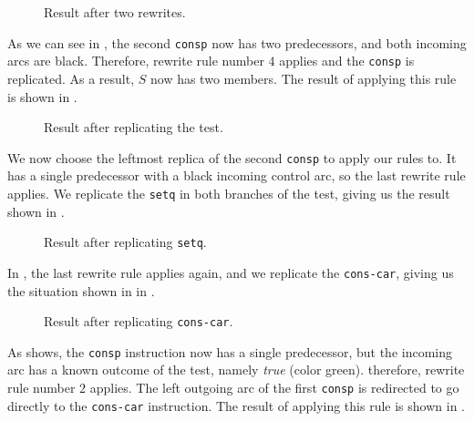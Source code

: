 \begin{figure}
\begin{center}
\end{center}
\caption{\label{fig-rewrite-2}
Result after two rewrites.}
\end{figure}

As we can see in , the second \texttt{consp}
now has two predecessors, and both incoming arcs are black.
Therefore, rewrite rule number $4$ applies and the \texttt{consp} is
replicated.  As a result, $S$ now has two members.  The result of
applying this rule is shown in .

\begin{figure}
\begin{center}
\end{center}
\caption{\label{fig-rewrite-3}
Result after replicating the test.}
\end{figure}

We now choose the leftmost replica of the second \texttt{consp} to
apply our rules to.  It has a single predecessor with a black incoming
control arc, so the last rewrite rule applies.  We replicate the
\texttt{setq} in both branches of the test, giving us the result shown
in .

\begin{figure}
\begin{center}
\end{center}
\caption{\label{fig-rewrite-4}
Result after replicating \texttt{setq}.}
\end{figure}

In , the last rewrite rule applies again, and we
replicate the \texttt{cons-car}, giving us the situation shown in in
.

\begin{figure}
\begin{center}
\end{center}
\caption{\label{fig-rewrite-5}
Result after replicating \texttt{cons-car}.}
\end{figure}

As  shows, the \texttt{consp} instruction now
has a single predecessor, but the incoming arc has a known outcome of
the test, namely \textit{true} (color green).  therefore, rewrite rule
number $2$ applies.  The left outgoing arc of the first \texttt{consp}
is redirected to go directly to the \texttt{cons-car} instruction.
The result of applying this rule is shown in .

